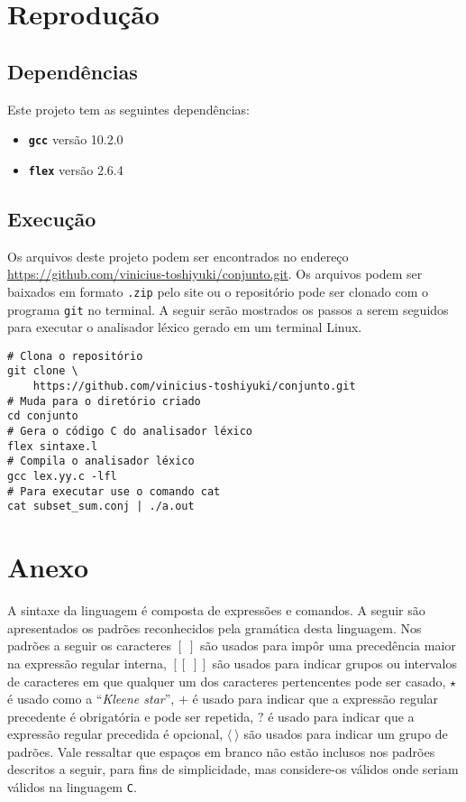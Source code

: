 \documentclass{llncs}
\begin{document}
\section{Reprodução}
\label{sec:reproducao}

\subsection{Dependências}

Este projeto tem as seguintes dependências:

\begin{itemize}
	\item \texttt{\bf gcc} versão 10.2.0
	\item \texttt{\bf flex} versão 2.6.4
\end{itemize}

\subsection{Execução}

Os arquivos deste projeto podem ser encontrados no endereço \url{https://github.com/vinicius-toshiyuki/conjunto.git}. Os arquivos podem ser baixados em formato \texttt{.zip} pelo site ou o repositório pode ser clonado com o programa \texttt{git} no terminal. A seguir serão mostrados os passos a serem seguidos para executar o analisador léxico gerado em um terminal Linux.

\begin{verbatim}
# Clona o repositório
git clone \
	https://github.com/vinicius-toshiyuki/conjunto.git
# Muda para o diretório criado
cd conjunto
# Gera o código C do analisador léxico
flex sintaxe.l
# Compila o analisador léxico
gcc lex.yy.c -lfl
# Para executar use o comando cat
cat subset_sum.conj | ./a.out
\end{verbatim}

\nocite{*}


\newpage
\section{Anexo}
\newcommand\pat[1]{$\mathbf{#1}$}
\newcommand\tok[1]{\langle #1 \rangle}

A sintaxe da linguagem é composta de expressões e comandos. A seguir são apresentados os padrões reconhecidos pela gramática desta linguagem. Nos padrões a seguir os caracteres \pat{[\;]} são usados para impôr uma precedência maior na expressão regular interna, \pat{[[\;]]} são usados para indicar grupos ou intervalos de caracteres em que qualquer um dos caracteres pertencentes pode ser casado, $\star$ é usado como a ``\textit{Kleene star}'', $+$ é usado para indicar que a expressão regular precedente é obrigatória e pode ser repetida, $?$ é usado para indicar que a expressão regular precedida é opcional, \pat{\tok{\:}} são usados para indicar um grupo de padrões. Vale ressaltar que espaços em branco não estão inclusos nos padrões descritos a seguir, para fins de simplicidade, mas considere-os válidos onde seriam válidos na linguagem \texttt{C}.
\end{document}
